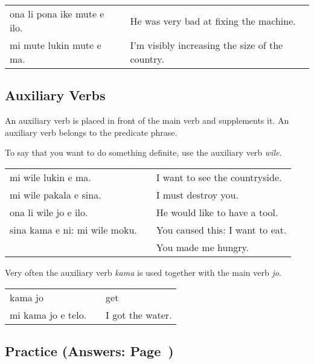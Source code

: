 \begin{supertabular}{p{5,5cm}|ll}
    ona li pona ike mute e ilo. &  & He was very bad at fixing the machine.          \\
    mi mute lukin mute e ma.    &  & I'm visibly increasing the size of the country. \\
\end{supertabular}

%
%
\subsection*{Auxiliary Verbs}
%
%
An auxiliary verb is placed in front of the main verb and supplements it.
An auxiliary verb belongs to the predicate phrase.

To say that you want to do something definite, use the auxiliary verb \textit{wile}.

\begin{supertabular}{p{5,5cm}|ll}
    mi wile lukin e ma.           &  & I want to see the countryside.  \\
    mi wile pakala e sina.        &  & I must destroy you.             \\
    ona li wile jo e ilo.         &  & He would like to have a tool.   \\
    sina kama e ni: mi wile moku. &  & You caused this: I want to eat. \\ && You made me hungry. \\
\end{supertabular}

Very often the auxiliary verb \textit{kama} is used together with the main verb \textit{jo}.

\begin{supertabular}{p{5,5cm}|ll}
    kama jo            &  & get              \\
    mi kama jo e telo. &  & I got the water. \\
\end{supertabular}

%
\newpage
\subsection*{Practice (Answers: Page~\pageref{'adverbs'})}

